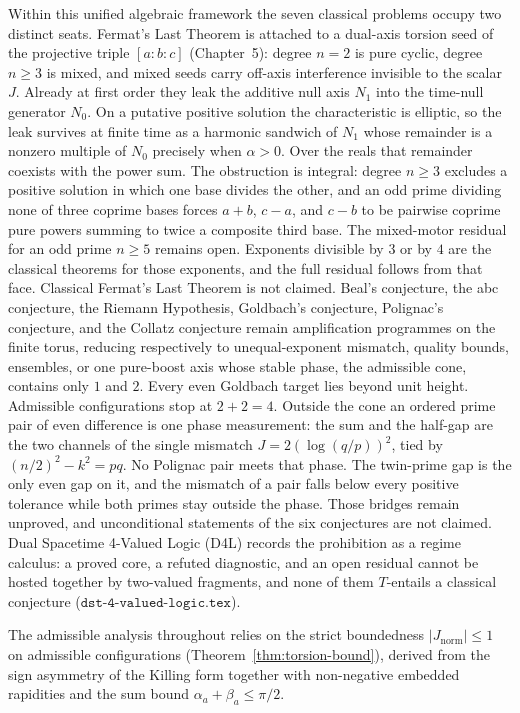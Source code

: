 \documentclass[a4paper]{article}
\theoremstyle{definition}
\theoremstyle{remark}
\newcommand{\Jnorm}{J_{\mathrm{norm}}}
\begin{document}
Within this unified algebraic framework the seven classical problems occupy two distinct seats. Fermat's Last Theorem is attached to a dual-axis torsion seed of the projective triple \([a:b:c]\) (Chapter~5): degree \(n=2\) is pure cyclic, degree \(n\ge 3\) is mixed, and mixed seeds carry off-axis interference invisible to the scalar \(J\). Already at first order they leak the additive null axis \(N_1\) into the time-null generator \(N_0\). On a putative positive solution the characteristic is elliptic, so the leak survives at finite time as a harmonic sandwich of \(N_1\) whose remainder is a nonzero multiple of \(N_0\) precisely when \(\alpha>0\). Over the reals that remainder coexists with the power sum. The obstruction is integral: degree \(n\ge 3\) excludes a positive solution in which one base divides the other, and an odd prime dividing none of three coprime bases forces \(a+b\), \(c-a\), and \(c-b\) to be pairwise coprime pure powers summing to twice a composite third base. The mixed-motor residual for an odd prime \(n\ge 5\) remains open. Exponents divisible by \(3\) or by \(4\) are the classical theorems for those exponents, and the full residual follows from that face. Classical Fermat’s Last Theorem is not claimed. Beal's conjecture, the abc conjecture, the Riemann Hypothesis, Goldbach's conjecture, Polignac's conjecture, and the Collatz conjecture remain amplification programmes on the finite torus, reducing respectively to unequal-exponent mismatch, quality bounds, ensembles, or one pure-boost axis whose stable phase, the admissible cone, contains only \(1\) and \(2\). Every even Goldbach target lies beyond unit height. Admissible configurations stop at \(2+2=4\). Outside the cone an ordered prime pair of even difference is one phase measurement: the sum and the half-gap are the two channels of the single mismatch \(J=2(\log(q/p))^2\), tied by \((n/2)^2-k^2=pq\). No Polignac pair meets that phase. The twin-prime gap is the only even gap on it, and the mismatch of a pair falls below every positive tolerance while both primes stay outside the phase. Those bridges remain unproved, and unconditional statements of the six conjectures are not claimed. Dual Spacetime 4-Valued Logic (D4L) records the prohibition as a regime calculus: a proved core, a refuted diagnostic, and an open residual cannot be hosted together by two-valued fragments, and none of them \(T\)-entails a classical conjecture (\(\texttt{dst-4-valued-logic.tex}\)).

The admissible analysis throughout relies on the strict boundedness \(|\Jnorm| \leq 1\) on admissible configurations (Theorem~\ref{thm:torsion-bound}), derived from the sign asymmetry of the Killing form together with non-negative embedded rapidities and the sum bound \(\alpha_a + \beta_a \leq \pi/2\).
\end{document}
